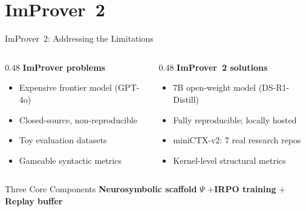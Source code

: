 \documentclass{beamer}
\newcommand{\good}[1]{\textcolor{improverGreen}{\textbf{#1}}}
\newcommand{\bad}[1]{\textcolor{improverRed}{\textbf{#1}}}
\begin{document}
\section{ImProver~2}

\begin{frame}{ImProver~2: Addressing the Limitations}
\vspace{0.3em}
\begin{columns}[T]
\begin{column}{0.48\textwidth}
\textbf{ImProver problems}\\[0.4em]
\begin{itemize}\setlength{\itemsep}{6pt}
  \item[\bad{$\times$}] Expensive frontier model (GPT-4o)
  \item[\bad{$\times$}] Closed-source, non-reproducible
  \item[\bad{$\times$}] Toy evaluation datasets
  \item[\bad{$\times$}] Gameable syntactic metrics
\end{itemize}
\end{column}
\begin{column}{0.48\textwidth}
\textbf{ImProver~2 solutions}\\[0.4em]
\begin{itemize}\setlength{\itemsep}{6pt}
  \item[\good{$\checkmark$}] 7B open-weight model (DS-R1-Distill)
  \item[\good{$\checkmark$}] Fully reproducible; locally hosted
  \item[\good{$\checkmark$}] miniCTX-v2: 7 real research repos
  \item[\good{$\checkmark$}] Kernel-level structural metrics
\end{itemize}
\end{column}
\end{columns}
\vspace{0.5em}
\begin{block}{Three Core Components}
  \textbf{Neurosymbolic scaffold} $\Psi$ \quad$+$\quad \textbf{IRPO training} \quad$+$\quad \textbf{Replay buffer}
\end{block}
\end{frame}
\end{document}
